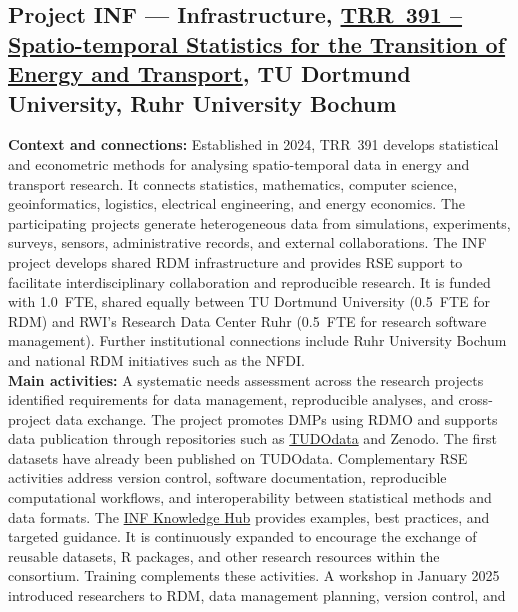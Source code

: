 \documentclass{eceasst}
\begin{document}
\subsection{Project INF --- Infrastructure,
\href{https://trr391.tu-dortmund.de/}
{TRR~391 -- Spatio-temporal Statistics for the Transition of Energy and Transport},
TU Dortmund University, Ruhr University Bochum}
\label{subsec:trr391}\vspace{-1em}
\noindent\textbf{Context and connections:}
Established in 2024, TRR~391 develops statistical and
econometric methods for analysing spatio-temporal data
in energy and transport research.
It connects statistics, mathematics, computer science,
geoinformatics, logistics, electrical engineering,
and energy economics.
The participating projects generate heterogeneous data
from simulations, experiments, surveys, sensors,
administrative records, and external collaborations.
The INF project develops shared RDM infrastructure
and provides RSE support to facilitate interdisciplinary
collaboration and reproducible research.
It is funded with 1.0~FTE,
shared equally between TU Dortmund University
(0.5~FTE for RDM) and RWI's Research Data Center Ruhr
(0.5~FTE for research software management).
Further institutional connections include Ruhr University
Bochum and national RDM initiatives such as the NFDI.
\\
\noindent\textbf{Main activities:}
A systematic needs assessment across the research projects
identified requirements for data management, reproducible
analyses, and cross-project data exchange.
The project promotes DMPs using RDMO and supports data publication through repositories such as
\href{https://data.tu-dortmund.de/dataverse/trr391}
{TUDOdata} and Zenodo. The first datasets have already
been published on TUDOdata.
Complementary RSE activities address version control,
software documentation, reproducible computational
workflows, and interoperability between statistical
methods and data formats.
The
\href{https://forschungsdatenzentrum-ruhr.github.io/INF-Website/}
{INF Knowledge Hub} provides examples, best practices,
and targeted guidance. It is continuously expanded
to encourage the exchange of reusable datasets,
R packages, and other research resources within
the consortium.
Training complements these activities. A workshop
in January 2025 introduced researchers to RDM,
data management planning, version control, and
\end{document}
